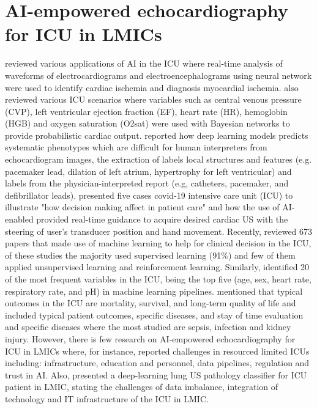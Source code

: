 \documentclass[mlabstract,twocolumn]{jmlr}
\begin{document}
\section{AI-empowered echocardiography for ICU in LMICs}
\citet{hanson2001} reviewed various applications of AI in the ICU where real-time analysis of waveforms of electrocardiograms and electroencephalograms using neural network were used to identify cardiac ischemia and diagnosis myocardial ischemia.
\citet{hanson2001} also reviewed various ICU scenarios where variables such as central venous pressure (CVP), left ventricular ejection fraction (EF), heart rate (HR), hemoglobin (HGB) and oxygen saturation (O2sat) were used with Bayesian networks to provide probabilistic cardiac output.
\citet{Ghorbani-DigitalMedicineNature-JAN2020} reported how deep learning models predicts systematic phenotypes which are difficult for human interpreters from echocardiogram images, the extraction of labels local structures and features (e.g. pacemaker lead, dilation of left atrium, hypertrophy for left ventricular) and labels from the physician-interpreted report (e.g, catheters, pacemaker, and defibrillator leads).
\citet{CHEEMA2021JACCCaseReports} presented five cases covid-19 intensive care unit (ICU) to illustrate "how decision making affect in patient care" and how the use of AI-enabled provided real-time guidance to acquire desired cardiac US with the steering of user's transducer position and hand movement.
Recently, \citet{hong2022} reviewed 673 papers that made use of machine learning to help for clinical decision in the ICU, of these studies the majority used supervised learning (91\%) and few of them applied unsupervised learning and reinforcement learning.
Similarly, \citet{hong2022} identified 20 of the most frequent variables in the ICU, being the top five (age, sex, heart rate, respiratory rate, and pH) in machine learning pipelines.
\citet{hong2022} mentioned that typical outcomes in the ICU are mortality, survival, and long-term quality of life and included typical patient outcomes, specific diseases, and stay of time evaluation and specific diseases where the most studied are sepsis, infection and kidney injury.
However, there is few research on AI-empowered echocardiography for ICU in LMICs where, for instance, \cite{2021-huyNhat-vanHao-in-FAIR-MICCAI} reported challenges in resourced limited ICUs including: infrastructure, education and personnel, data pipelines, regulation and trust in AI.
Also, \cite{2021-kerdegari-Applied-Sciences-MDPI, 2021-kerdegari-ISBI-IEEE, 2021-huyNhat-kerdegari-in-FAIR-MICCAI} presented a deep-learning lung US pathology classifier for ICU patient in LMIC, stating the challenges of data imbalance, integration of technology and IT infrastructure of the ICU in LMIC.
\end{document}

